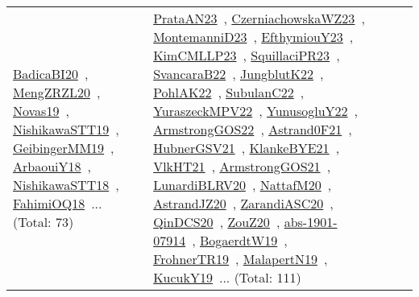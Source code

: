 {\begin{longtable}{lp{3cm}>{\raggedright\arraybackslash}p{6cm}>{\raggedright\arraybackslash}p{6cm}>{\raggedright\arraybackslash}p{8cm}}
\href{works/BadicaBI20.pdf}{BadicaBI20}~\cite{BadicaBI20}, \href{works/MengZRZL20.pdf}{MengZRZL20}~\cite{MengZRZL20}, \href{works/Novas19.pdf}{Novas19}~\cite{Novas19}, \href{works/NishikawaSTT19.pdf}{NishikawaSTT19}~\cite{NishikawaSTT19}, \href{works/GeibingerMM19.pdf}{GeibingerMM19}~\cite{GeibingerMM19}, \href{works/ArbaouiY18.pdf}{ArbaouiY18}~\cite{ArbaouiY18}, \href{works/NishikawaSTT18.pdf}{NishikawaSTT18}~\cite{NishikawaSTT18}, \href{works/FahimiOQ18.pdf}{FahimiOQ18}~\cite{FahimiOQ18}... (Total: 73) & \href{works/PrataAN23.pdf}{PrataAN23}~\cite{PrataAN23}, \href{works/CzerniachowskaWZ23.pdf}{CzerniachowskaWZ23}~\cite{CzerniachowskaWZ23}, \href{works/MontemanniD23.pdf}{MontemanniD23}~\cite{MontemanniD23}, \href{works/EfthymiouY23.pdf}{EfthymiouY23}~\cite{EfthymiouY23}, \href{works/KimCMLLP23.pdf}{KimCMLLP23}~\cite{KimCMLLP23}, \href{works/SquillaciPR23.pdf}{SquillaciPR23}~\cite{SquillaciPR23}, \href{works/SvancaraB22.pdf}{SvancaraB22}~\cite{SvancaraB22}, \href{works/JungblutK22.pdf}{JungblutK22}~\cite{JungblutK22}, \href{works/PohlAK22.pdf}{PohlAK22}~\cite{PohlAK22}, \href{works/SubulanC22.pdf}{SubulanC22}~\cite{SubulanC22}, \href{works/YuraszeckMPV22.pdf}{YuraszeckMPV22}~\cite{YuraszeckMPV22}, \href{works/YunusogluY22.pdf}{YunusogluY22}~\cite{YunusogluY22}, \href{works/ArmstrongGOS22.pdf}{ArmstrongGOS22}~\cite{ArmstrongGOS22}, \href{works/Astrand0F21.pdf}{Astrand0F21}~\cite{Astrand0F21}, \href{works/HubnerGSV21.pdf}{HubnerGSV21}~\cite{HubnerGSV21}, \href{works/KlankeBYE21.pdf}{KlankeBYE21}~\cite{KlankeBYE21}, \href{works/VlkHT21.pdf}{VlkHT21}~\cite{VlkHT21}, \href{works/ArmstrongGOS21.pdf}{ArmstrongGOS21}~\cite{ArmstrongGOS21}, \href{works/LunardiBLRV20.pdf}{LunardiBLRV20}~\cite{LunardiBLRV20}, \href{works/NattafM20.pdf}{NattafM20}~\cite{NattafM20}, \href{works/AstrandJZ20.pdf}{AstrandJZ20}~\cite{AstrandJZ20}, \href{works/ZarandiASC20.pdf}{ZarandiASC20}~\cite{ZarandiASC20}, \href{works/QinDCS20.pdf}{QinDCS20}~\cite{QinDCS20}, \href{works/ZouZ20.pdf}{ZouZ20}~\cite{ZouZ20}, \href{works/abs-1901-07914.pdf}{abs-1901-07914}~\cite{abs-1901-07914}, \href{works/BogaerdtW19.pdf}{BogaerdtW19}~\cite{BogaerdtW19}, \href{works/FrohnerTR19.pdf}{FrohnerTR19}~\cite{FrohnerTR19}, \href{works/MalapertN19.pdf}{MalapertN19}~\cite{MalapertN19}, \href{works/KucukY19.pdf}{KucukY19}~\cite{KucukY19}... (Total: 111)\\

\end{longtable}}
